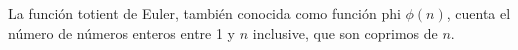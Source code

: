 La función totient de Euler, también conocida como función phi $\phi (n)$, cuenta el número de números enteros entre 1 y $n$ inclusive, que son coprimos de $n$. 